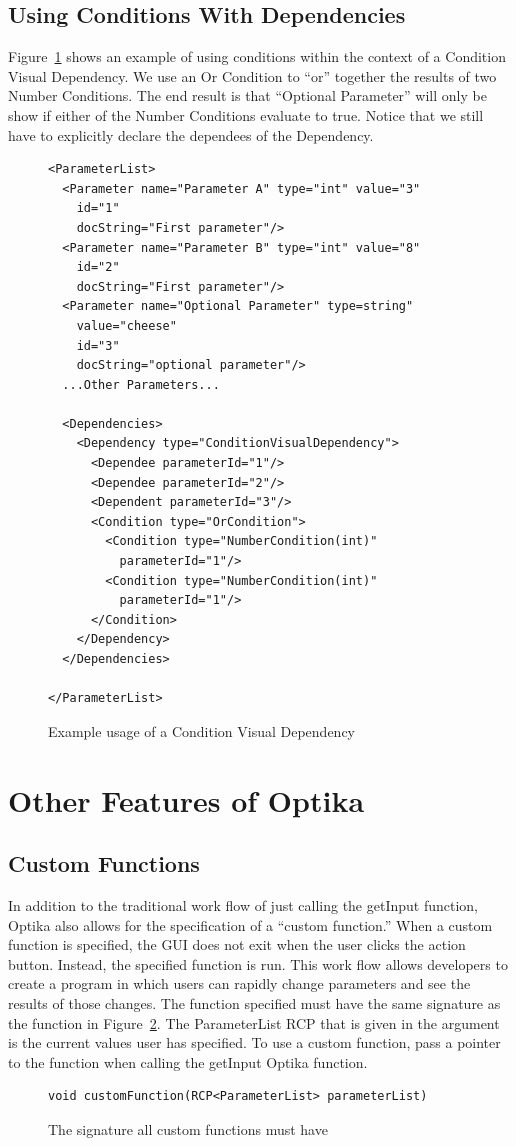 \subsection{Using Conditions With Dependencies}
Figure~\ref{conVisDep} shows an example of using conditions within the context of a Condition Visual Dependency.
We use an Or Condition to ``or'' together the results of two Number Conditions. The end result is that ``Optional Parameter'' 
will only be show if either of the Number Conditions evaluate to true. Notice that we still have to explicitly declare
the dependees of the Dependency.
\begin{figure}
\centering
{\footnotesize
\begin{verbatim}
<ParameterList>
  <Parameter name="Parameter A" type="int" value="3"
    id="1"
    docString="First parameter"/>
  <Parameter name="Parameter B" type="int" value="8"
    id="2"
    docString="First parameter"/>
  <Parameter name="Optional Parameter" type=string"
    value="cheese"
    id="3"
    docString="optional parameter"/>
  ...Other Parameters...

  <Dependencies>
    <Dependency type="ConditionVisualDependency">
      <Dependee parameterId="1"/>
      <Dependee parameterId="2"/>
      <Dependent parameterId="3"/>
      <Condition type="OrCondition">
        <Condition type="NumberCondition(int)" 
          parameterId="1"/>
        <Condition type="NumberCondition(int)"
          parameterId="1"/>
      </Condition>
    </Dependency>
  </Dependencies>

</ParameterList>
\end{verbatim}
}
\caption{Example usage of a Condition Visual Dependency}
\label{conVisDep}
\end{figure}

\section{Other Features of Optika}
\subsection{Custom Functions}
In addition to the traditional work flow of just calling the getInput function, Optika also allows for the specification of a ``custom function.''
When a custom function is specified, the GUI does not exit when the user clicks the action button. Instead, the specified function is run. This work flow allows developers 
to create a program in which users can rapidly change parameters and see the results of those changes. The function specified must have the same signature as the function 
in Figure~\ref{custSig}. The ParameterList RCP that is given in the argument is the current values user has specified. To use a custom function, pass a pointer to the
function when calling the getInput Optika function.
\begin{figure}
\centering
{\footnotesize
\begin{verbatim}
void customFunction(RCP<ParameterList> parameterList)
\end{verbatim}
}
\caption{The signature all custom functions must have}
\label{custSig}
\end{figure}

